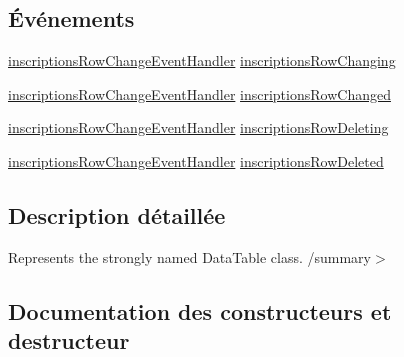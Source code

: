 \subsection*{Événements}
\begin{DoxyCompactItemize}
\item 
\hyperlink{classforma_1_1formadb_data_set_ad467b14ecca7a1716cfeebbf3b225e71}{inscriptions\+Row\+Change\+Event\+Handler} \hyperlink{classforma_1_1formadb_data_set_1_1inscriptions_data_table_ac50d0d24e3faf9edc84367c028f0f0a0}{inscriptions\+Row\+Changing}
\item 
\hyperlink{classforma_1_1formadb_data_set_ad467b14ecca7a1716cfeebbf3b225e71}{inscriptions\+Row\+Change\+Event\+Handler} \hyperlink{classforma_1_1formadb_data_set_1_1inscriptions_data_table_aa9f9fc055791315389083c66e55e28cc}{inscriptions\+Row\+Changed}
\item 
\hyperlink{classforma_1_1formadb_data_set_ad467b14ecca7a1716cfeebbf3b225e71}{inscriptions\+Row\+Change\+Event\+Handler} \hyperlink{classforma_1_1formadb_data_set_1_1inscriptions_data_table_afdbbf33b015cc75e3fd772e88dcd0cfa}{inscriptions\+Row\+Deleting}
\item 
\hyperlink{classforma_1_1formadb_data_set_ad467b14ecca7a1716cfeebbf3b225e71}{inscriptions\+Row\+Change\+Event\+Handler} \hyperlink{classforma_1_1formadb_data_set_1_1inscriptions_data_table_aea6916f9679b0e4570c7239ccead54fb}{inscriptions\+Row\+Deleted}
\end{DoxyCompactItemize}


\subsection{Description détaillée}
Represents the strongly named Data\+Table class. /summary$>$ 

\subsection{Documentation des constructeurs et destructeur}
